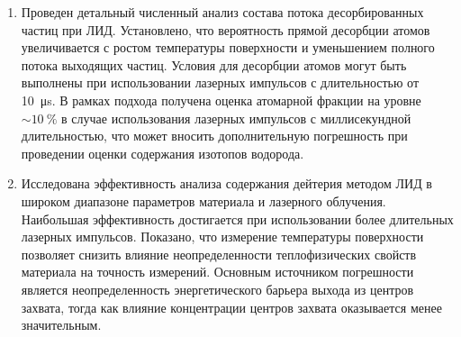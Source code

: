 \begin{enumerate}
  \item Проведен детальный численный анализ состава потока десорбированных частиц при ЛИД. Установлено, что вероятность прямой десорбции атомов увеличивается с ростом температуры поверхности и уменьшением полного потока выходящих частиц. Условия для десорбции атомов могут быть выполнены при использовании лазерных импульсов с длительностью от \SI{10}{\micro\second}. В рамках подхода получена оценка атомарной фракции на уровне \( \sim \SI{10}{\percent} \) в случае использования лазерных импульсов с миллисекундной длительностью, что может вносить дополнительную погрешность при проведении оценки содержания изотопов водорода.
  \item Исследована эффективность анализа содержания дейтерия методом ЛИД в широком диапазоне параметров материала и лазерного облучения. Наибольшая эффективность достигается при использовании более длительных лазерных импульсов. Показано, что измерение температуры поверхности позволяет снизить влияние неопределенности теплофизических свойств материала на точность измерений. Основным источником погрешности является неопределенность энергетического барьера выхода из центров захвата, тогда как влияние концентрации центров захвата оказывается менее значительным.    
\end{enumerate}

